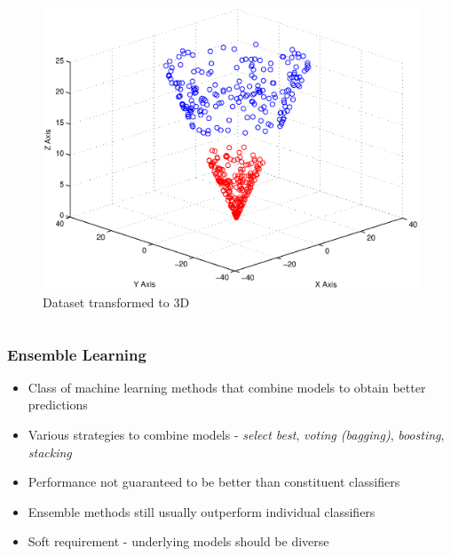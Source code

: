 \documentclass[xcolor=table]{beamer}
\begin{document}
\begin{frame}
\begin{columns}
{\begin{column}{0.4\textwidth}
\begin{figure}
                        \includegraphics[width=\textwidth]{figures/svm_non_linear_data_3d.eps}
                        \caption{Dataset transformed to 3D}
                    \end{figure}
                \end{column}
            }
        \end{columns}
    \end{frame}
    
    \begin{frame}
        \frametitle{Ensemble Learning}
        \begin{itemize}
            \item{Class of machine learning methods that combine models to obtain better predictions}
            \item{Various strategies to combine models - \emph{select best}, \emph{voting (bagging)}, \emph{boosting}, \emph{stacking}}
            \pause
            \item{Performance not guaranteed to be better than constituent classifiers}
            \item{Ensemble methods still usually outperform individual classifiers}
            \item{Soft requirement - underlying models should be diverse}
        \end{itemize}
    \end{frame}
    
\end{document}
